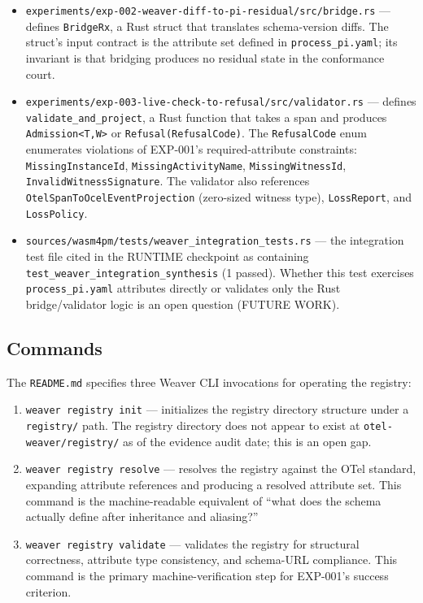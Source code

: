 \begin{itemize}
  \item \texttt{experiments/exp-002-weaver-diff-to-pi-residual/src/bridge.rs} --- defines
        \texttt{BridgeRx}, a Rust struct that translates schema-version diffs. The struct's
        input contract is the attribute set defined in \texttt{process\_pi.yaml}; its invariant
        is that bridging produces no residual state in the conformance court.
  \item \texttt{experiments/exp-003-live-check-to-refusal/src/validator.rs} --- defines
        \texttt{validate\_and\_project}, a Rust function that takes a span and produces
        \texttt{Admission<T,W>} or \texttt{Refusal(RefusalCode)}. The \texttt{RefusalCode} enum
        enumerates violations of EXP-001's required-attribute constraints:
        \texttt{MissingInstanceId}, \texttt{MissingActivityName}, \texttt{MissingWitnessId},
        \texttt{InvalidWitnessSignature}. The validator also references
        \texttt{OtelSpanToOcelEventProjection} (zero-sized witness type),
        \texttt{LossReport}, and \texttt{LossPolicy}.
  \item \texttt{sources/wasm4pm/tests/weaver\_integration\_tests.rs} --- the integration test
        file cited in the RUNTIME checkpoint as containing \texttt{test\_weaver\_integration\_synthesis}
        (1 passed). Whether this test exercises \texttt{process\_pi.yaml} attributes directly or
        validates only the Rust bridge/validator logic is an open question (FUTURE WORK).
\end{itemize}

\subsection{Commands}
\label{sec:otel-weaver-exp-001-custom-pi-registry-implementation-commands}

The \texttt{README.md} specifies three Weaver CLI invocations for operating the registry:

\begin{enumerate}
  \item \texttt{weaver registry init} --- initializes the registry directory structure under a
        \texttt{registry/} path. The registry directory does not appear to exist at
        \texttt{otel-weaver/registry/} as of the evidence audit date; this is an open gap.
  \item \texttt{weaver registry resolve} --- resolves the registry against the OTel standard,
        expanding attribute references and producing a resolved attribute set. This command is
        the machine-readable equivalent of ``what does the schema actually define after
        inheritance and aliasing?''
  \item \texttt{weaver registry validate} --- validates the registry for structural correctness,
        attribute type consistency, and schema-URL compliance. This command is the primary
        machine-verification step for EXP-001's success criterion.
\end{enumerate}

